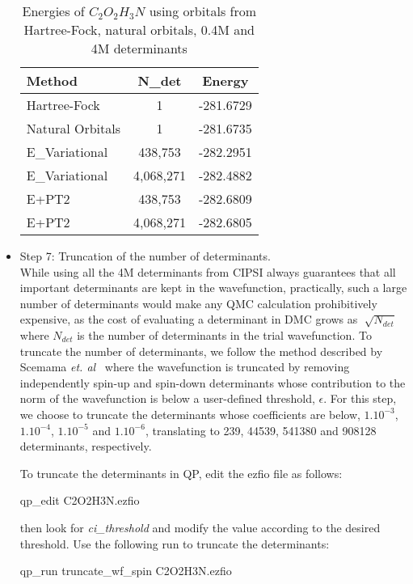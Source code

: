 \begin{itemize}
\begin{table}[t]
\centering
\caption{Energies of $C_2O_2H_3N$ using orbitals from Hartree-Fock, natural orbitals, 0.4M and 4M determinants}
\label{TAB:CIPSI}
\begin{tabular}{l|c|c}
\hline \hline
Method & N\_det & Energy\\
\hline
Hartree-Fock &    1    & -281.6729\\
Natural Orbitals & 1 & -281.6735\\
E\_Variational &  438,753 & -282.2951 \\
E\_Variational &  4,068,271   & -282.4882 \\
E+PT2 & 438,753& -282.6809 \\
E+PT2 & 4,068,271 & -282.6805  \\ \hline \hline
\end{tabular}
\end{table}


\item Step 7: Truncation of the number of determinants.\\ While using
  all the 4M determinants from CIPSI always guarantees that all
  important determinants are kept in the wavefunction, practically,
  such a large number of determinants would make any QMC calculation
  prohibitively expensive, as the cost of evaluating a determinant in
  DMC grows as $\sqrt[]{N_{det}}$ where $N_{det}$ is the number of
  determinants in the trial wavefunction. To truncate the number of
  determinants, we follow the method described by Scemama
  \textit{et. al}~\cite{Scemama2018} where the wavefunction is
  truncated by removing independently spin-up and spin-down
  determinants whose contribution to the norm of the wavefunction is
  below a user-defined threshold, $\epsilon$. For this step, we choose
  to truncate the determinants whose coefficients are below,
  $1.10^{-3}$, $1.10^{-4}$, $1.10^{-5}$ and $1.10^{-6}$, translating
  to 239, 44539, 541380 and 908128 determinants, respectively.

To  truncate the determinants in QP, edit the ezfio file as follows:

\begin{shade}
qp_edit C2O2H3N.ezfio  
\end{shade}

then look for \textit{ci\_threshold} and modify the value according to the desired threshold. Use the following run to truncate the determinants:

\begin{shade}
qp_run truncate_wf_spin C2O2H3N.ezfio  
\end{shade}


\end{itemize}
